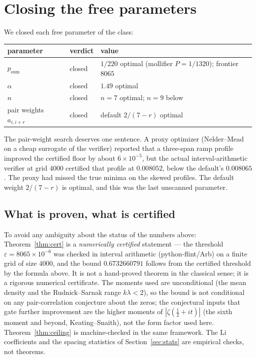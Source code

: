 \documentclass[11pt]{article}
\theoremstyle{remark}
\newcommand{\eps}{\varepsilon}
\newcommand{\Zeta}{\zeta}
\begin{document}
\section{Closing the free parameters}

We closed each free parameter of the class:

\begin{center}
\begin{tabular}{lll}
\toprule
parameter & verdict & value \\
\midrule
$p_{\mathrm{sum}}$ & closed & $1/220$ optimal (mollifier $P=1/1320$); frontier $8065$ \\
$\alpha$ & closed & $1.49$ optimal \\
$n$ & closed & $n=7$ optimal; $n=9$ below \\
pair weights $a_{i,i+r}$ & closed & default $2/(7-r)$ optimal \\
\bottomrule
\end{tabular}
\end{center}

The pair-weight search deserves one sentence. A proxy optimizer (Nelder--Mead on a
cheap surrogate of the verifier) reported that a three-span ramp profile improved the
certified floor by about $6\times10^{-5}$, but the actual interval-arithmetic verifier
at grid $4000$ certified that profile at $0.008052$, below the default's $0.008065$.
The proxy had missed the true minima on the skewed profiles. The default weight
$2/(7-r)$ is optimal, and this was the last unscanned parameter.

\subsection*{What is proven, what is certified}

To avoid any ambiguity about the status of the numbers above: Theorem~\ref{thm:cert}
is a \emph{numerically certified} statement --- the threshold $\eps=8065\times10^{-6}$
was checked in interval arithmetic (python-flint/Arb) on a finite grid of size $4000$,
and the bound $0.6732660791$ follows from the certified threshold by the formula above.
It is not a hand-proved theorem in the classical sense; it is a rigorous numerical
certificate. The moments used are unconditional (the mean density and the
Rudnick--Sarnak range $k\lambda<2$), so the bound is not conditional on any
pair-correlation conjecture about the zeros; the conjectural inputs that gate further
improvement are the higher moments of $|\Zeta(\tfrac12+it)|$ (the sixth moment and
beyond, Keating--Snaith), not the form factor used here. Theorem~\ref{thm:ceiling} is
machine-checked in the same framework. The Li coefficients and the spacing statistics
of Section~\ref{sec:stats} are empirical checks, not theorems.
\end{document}
